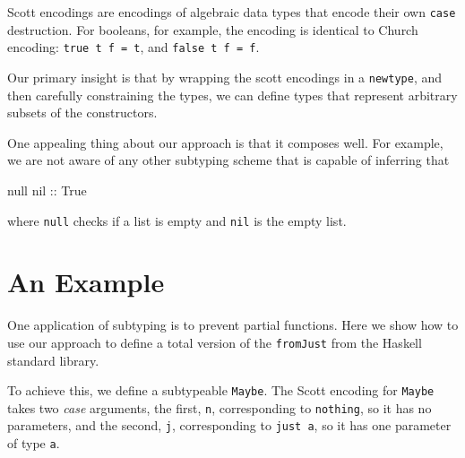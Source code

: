 \documentclass[]{article}
\newenvironment{Shaded}{}{}
\newcommand{\KeywordTok}[1]{\textcolor[rgb]{0.00,0.44,0.13}{\textbf{{#1}}}}
\newcommand{\DataTypeTok}[1]{\textcolor[rgb]{0.56,0.13,0.00}{{#1}}}
\newcommand{\OtherTok}[1]{\textcolor[rgb]{0.00,0.44,0.13}{{#1}}}
\newcommand{\FunctionTok}[1]{\textcolor[rgb]{0.02,0.16,0.49}{{#1}}}
\newcommand{\NormalTok}[1]{{#1}}
\begin{document}
Scott encodings are encodings of algebraic data types that encode their
own \texttt{case} destruction. For booleans, for example, the encoding
is identical to Church encoding: \texttt{true\ t\ f\ =\ t}, and
\texttt{false\ t\ f\ =\ f}.

Our primary insight is that by wrapping the scott encodings in a
\texttt{newtype}, and then carefully constraining the types, we can
define types that represent arbitrary subsets of the constructors.

One appealing thing about our approach is that it composes well. For
example, we are not aware of any other subtyping scheme that is capable
of inferring that

\begin{Shaded}
\begin{Highlighting}[]
   \NormalTok{null}\OtherTok{ nil ::} \DataTypeTok{True}
\end{Highlighting}
\end{Shaded}

where \texttt{null} checks if a list is empty and \texttt{nil} is the
empty list.

\section{An Example}\label{an-example}

One application of subtyping is to prevent partial functions. Here we
show how to use our approach to define a total version of the
\texttt{fromJust} from the Haskell standard library.

To achieve this, we define a subtypeable \texttt{Maybe}. The Scott
encoding for \texttt{Maybe} takes two \emph{case} arguments, the first,
\texttt{n}, corresponding to \texttt{nothing}, so it has no parameters,
and the second, \texttt{j}, corresponding to \texttt{just\ a}, so it has
one parameter of type \texttt{a}.

\begin{Shaded}
\end{Shaded}
\end{document}
